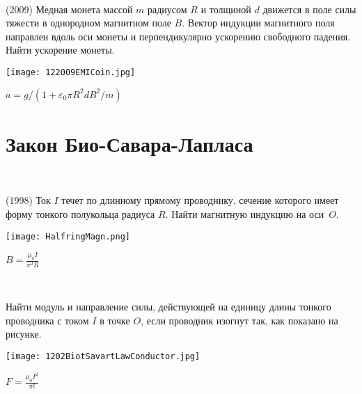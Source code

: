 \begin{ex}
\hspace{0pt} \\
\begin{minipage}{.65\textwidth}
(2009) Медная монета массой $m$ радиусом $R$ и толщиной $d$ движется в поле силы тяжести в однородном магнитном поле $B$. 
Вектор индукции магнитного поля направлен вдоль оси монеты и перпендикулярно ускорению свободного падения. Найти ускорение монеты.
\end{minipage}
\begin{minipage}{.35\textwidth}
\centering
\texttt{[image: 122009EMICoin.jpg]}
\end{minipage}
\begin{ans}
$a=g/(1+ \varepsilon_0 \pi R^2 d B^2 / m)$
\end{ans}
\end{ex}

\section{Закон Био-Савара-Лапласа}

\begin{ex}
\hspace{0pt} \\
\begin{minipage}{.65\textwidth}
(1998) Ток $I$ течет по длинному прямому проводнику, сечение которого имеет форму тонкого полукольца радиуса $R$. Найти магнитную индукцию на оси~$O$.
\end{minipage}
\begin{minipage}{.35\textwidth}
\centering
\texttt{[image: HalfringMagn.png]}
\end{minipage}
\begin{ans}
$B = \frac{\mu_0 I}{\pi^2 R}$
\end{ans}
\end{ex}

\begin{ex}
\hspace{0pt} \\
\begin{minipage}{.65\textwidth}
Найти модуль и направление силы, действующей на единицу длины тонкого проводника с током $I$ в точке $O$, если проводник изогнут так, как показано на рисунке.
\end{minipage}
\begin{minipage}{.35\textwidth}
\centering
\texttt{[image: 1202BiotSavartLawConductor.jpg]}
\end{minipage}
\begin{ans}
$F = \frac{\mu_0 I^2}{\pi l}$
\end{ans}
\end{ex}

